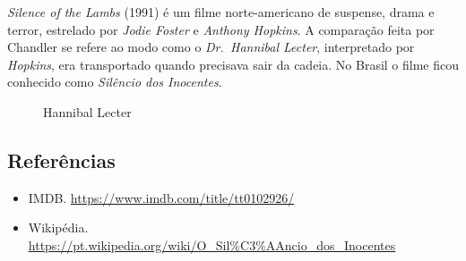 \emph{Silence of the Lambs} (1991) é um filme norte-americano de
suspense, drama e terror, estrelado por \emph{Jodie Foster} e
\emph{Anthony Hopkins}. A comparação feita por Chandler se refere ao
modo como o \emph{Dr.~Hannibal Lecter}, interpretado por \emph{Hopkins},
era transportado quando precisava sair da cadeia. No Brasil o filme
ficou conhecido como \emph{Silêncio dos Inocentes}.

\begin{figure}
  \centering
    \caption{Hannibal Lecter\label{fig:hannibal-lecter}}
\end{figure}

\hypertarget{referuxeancias-5}{%
\subsection{Referências}\label{referuxeancias-5}}

\begin{itemize}
\tightlist
\item
  \sloppy IMDB. \url{https://www.imdb.com/title/tt0102926/}
\item
  \sloppy Wikipédia. \url{https://pt.wikipedia.org/wiki/O_Sil%C3%AAncio_dos_Inocentes}
\end{itemize}
